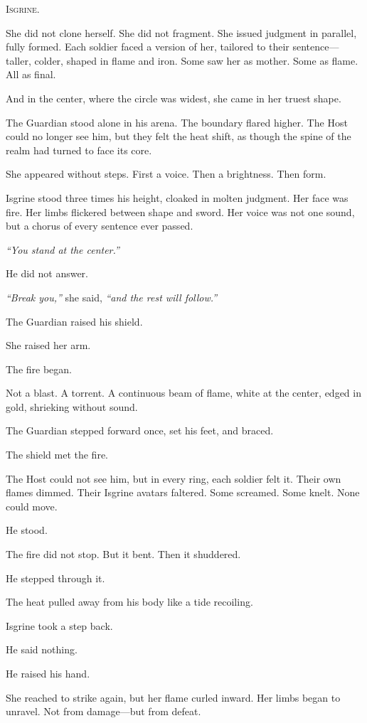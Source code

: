 \documentclass[9pt]{article}
\begin{document}
\textsc{Isgrine.}

She did not clone herself. She did not fragment. She issued judgment in parallel, fully formed. Each soldier faced a version of her, tailored to their sentence—taller, colder, shaped in flame and iron. Some saw her as mother. Some as flame. All as final.

And in the center, where the circle was widest, she came in her truest shape.

The Guardian stood alone in his arena. The boundary flared higher. The Host could no longer see him, but they felt the heat shift, as though the spine of the realm had turned to face its core.

She appeared without steps. First a voice. Then a brightness. Then form.

Isgrine stood three times his height, cloaked in molten judgment. Her face was fire. Her limbs flickered between shape and sword. Her voice was not one sound, but a chorus of every sentence ever passed.

\textit{``You stand at the center.''}

He did not answer.

\textit{``Break you,''} she said, \textit{``and the rest will follow.''}

The Guardian raised his shield.

She raised her arm.

The fire began.

Not a blast. A torrent. A continuous beam of flame, white at the center, edged in gold, shrieking without sound.

The Guardian stepped forward once, set his feet, and braced.

The shield met the fire.

The Host could not see him, but in every ring, each soldier felt it. Their own flames dimmed. Their Isgrine avatars faltered. Some screamed. Some knelt. None could move.

He stood.

The fire did not stop. But it bent. Then it shuddered.

He stepped through it.

The heat pulled away from his body like a tide recoiling.

Isgrine took a step back.

He said nothing.

He raised his hand.

She reached to strike again, but her flame curled inward. Her limbs began to unravel. Not from damage—but from defeat.
\end{document}
